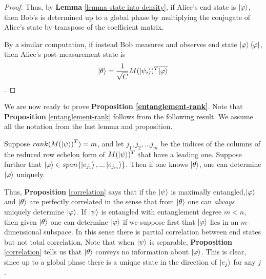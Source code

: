 \begin{proof}
Thus, by {\bf{Lemma}} \ref{lemma state into density}, if Alice's end state is $\ket{\varphi}$, then Bob's is determined up to a global phase by multiplying the conjugate of Alice's state by transpose of the coefficient matrix.


By a similar computation, if instead Bob measures and observes end state $\ket{\varphi}\bra{\varphi}$, then Alice's post-measurement state is $$\ket{\theta}=\frac{1}{\sqrt{C}} M(\ket{\psi_i})^T \overline{\ket{\varphi}}$$.
\end{proof}

\medskip
We are now ready to prove \textbf{Proposition \ref{entanglement-rank}}.  Note that {\bf{Proposition}} \ref{entanglement-rank} follows from the following result.  We assume all the notation from the last lemma and proposition.
\begin{prop}
\label{correlation}
Suppose $rank({M(\ket{\psi})}^T)=m$, and let $j_1, j_2, ... j_m$ be the indices of the columns of the reduced row echelon form of $M(\ket{\psi})^T$ that have a leading one.  Suppose further that $\ket{\varphi} \in span\{\ket{e_{j_1}}, ... \ket{e_{j_m}}\}$.  Then if one knows $\ket{\theta}$, one can determine $\ket{\varphi}$ uniquely.  
\end{prop}
Thus, {\bf{Proposition}} \ref{correlation} says that if the $\ket{\psi}$ is maximally entangled,$\ket{\varphi}$ and $\ket{\theta}$ are perfectly correlated in the sense that from $\ket{\theta}$ one can {\emph{always}} uniquely determine $\ket{\varphi}$.  If $\ket{\psi}$ is entangled with entanglement degree $m<n$, then given $\ket{\theta}$ one can determine $\ket{\varphi}$ if we suppose first that $\ket{\varphi}$ lies in an $m$-dimensional subspace.  In this sense there is partial correlation between end states but not total correlation.  Note that when $\ket{\psi}$ is separable, {\bf{Proposition}} \ref{correlation} tells us that $\ket{\theta}$ conveys no information about $\ket{\varphi}$.  This is clear, since up to a global phase there is a unique state in the direction of $\ket{e_j}$ for any $j$.

